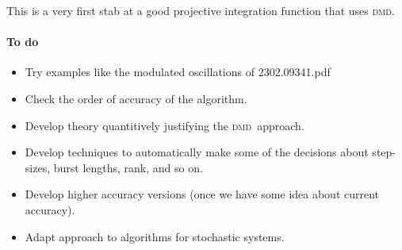 \localtableofcontents

\def\dmd{\textsc{dmd}}

This is a very first stab at a good projective integration function that uses \dmd.

\paragraph{To do}
\begin{itemize}
\item Try examples like the modulated oscillations of 2302.09341.pdf

\item Check the order of accuracy of the algorithm.
\item Develop theory quantitively justifying the \dmd\ approach.
\item Develop techniques to automatically make some of the decisions about step-sizes, burst lengths, rank, and so on.
\item Develop higher accuracy versions (once we have some idea about current accuracy).
\item Adapt approach to algorithms for stochastic systems.
\end{itemize}









